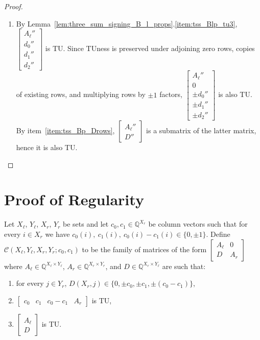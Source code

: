\begin{proof}
\begin{enumerate}
        \item By Lemma~\ref{lem:three_sum_signing_B_l_props}.\ref{item:tss_Blp_tu3}, $\begin{bmatrix} A_{\ell}'' \\ d_{0}'' \\ d_{1}'' \\ d_{2}'' \end{bmatrix}$ is TU. Since TUness is preserved under adjoining zero rows, copies of existing rows, and multiplying rows by $\pm 1$ factors, $\begin{bmatrix} A_{\ell}'' \\ 0 \\ \pm d_{0}'' \\ \pm d_{1}'' \\ \pm d_{2}'' \end{bmatrix}$ is also TU. By item~\ref{item:tss_Bp_Drows}, $\begin{bmatrix} A_{\ell}'' \\ D'' \end{bmatrix}$ is a submatrix of the latter matrix, hence it is also TU.
    \end{enumerate}
\end{proof}


\section{Proof of Regularity}

\begin{definition}\label{def:three_sum_like_matrix}
    Let $X_{\ell}$, $Y_{\ell}$, $X_{r}$, $Y_{r}$ be sets and let $c_{0}, c_{1} \in \mathbb{Q}^{X_{r}}$ be column vectors such that for every $i \in X_{r}$ we have $c_{0} (i), \ c_{1} (i), \ c_{0} (i) - c_{1} (i) \in \{0, \pm 1\}$. Define $\mathcal{C} (X_{\ell}, Y_{\ell}, X_{r}, Y_{r}; c_{0}, c_{1})$ to be the family of matrices of the form $\begin{bmatrix} A_{\ell} & 0 \\ D & A_{r} \end{bmatrix}$ where $A_{\ell} \in \mathbb{Q}^{X_{\ell} \times Y_{\ell}}$, $A_{r} \in \mathbb{Q}^{X_{r} \times Y_{r}}$, and $D \in \mathbb{Q}^{X_{r} \times Y_{\ell}}$ are such that:
    \begin{enumerate}
        \item\label{item:tsl_cols} for every $j \in Y_{r}$, $D (X_{r}, j) \in \{0, \pm c_{0}, \pm c_{1}, \pm (c_{0} - c_{1})\}$,
        \item\label{item:tsl_bot} $\begin{bmatrix} c_{0} & c_{1} & c_{0} - c_{1} & A_{r} \end{bmatrix}$ is TU,
        \item\label{item:tsl_left} $\begin{bmatrix} A_{\ell} \\ D \end{bmatrix}$ is TU.
    \end{enumerate}
\end{definition}


